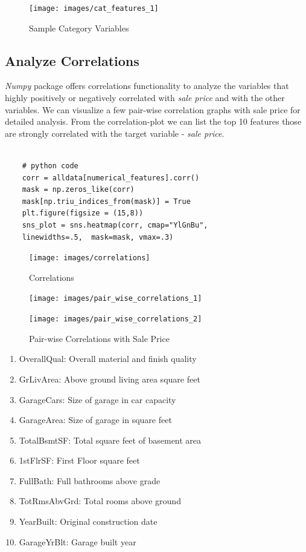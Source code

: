 \documentclass[sigconf]{acmart}
\begin{document}
	\begin{figure}[H]
		\centering
		\texttt{[image: images/cat\_features\_1]}	
		\caption{Sample Category Variables} \label{fig:cat_features_1} 
	\end{figure}
	
	\subsection{Analyze Correlations}		
	{\em Numpy} package offers correlations functionality to analyze the variables that highly positively or negatively correlated with {\em sale price} and with the other variables. We can  visualize a few pair-wise correlation graphs with sale price for detailed analysis. From the correlation-plot we can list the top 10 features those are strongly correlated with the target variable - {\em sale price}.
	
	\begin{verbatim}
	
	# python code 
	corr = alldata[numerical_features].corr()	
	mask = np.zeros_like(corr)
	mask[np.triu_indices_from(mask)] = True	
	plt.figure(figsize = (15,8))	
	sns_plot = sns.heatmap(corr, cmap="YlGnBu", 
	linewidths=.5,  mask=mask, vmax=.3)	
	\end{verbatim}
	
	\begin{figure}[H]
		\centering
		\texttt{[image: images/correlations]}	
		\caption{Correlations} \label{fig:correlations} 
	\end{figure}
	
	\begin{figure}[H]
		\centering
		\texttt{[image: images/pair\_wise\_correlations\_1]}	
	\end{figure}
	
	\begin{figure}[H]
		\centering
		\texttt{[image: images/pair\_wise\_correlations\_2]}	
		\caption{Pair-wise Correlations with Sale Price} \label{fig:pair_wise_correlations_2} 
	\end{figure}
	
	\begin{enumerate}
		\item OverallQual: Overall material and finish quality
		\item GrLivArea: Above ground living area square feet
		\item GarageCars: Size of garage in car capacity
		\item GarageArea: Size of garage in square feet
		\item TotalBsmtSF: Total square feet of basement area
		\item 1stFlrSF: First Floor square feet
		\item FullBath: Full bathrooms above grade
		\item TotRmsAbvGrd: Total rooms above ground
		\item YearBuilt: Original construction date
		\item GarageYrBlt: Garage built year		
	\end{enumerate}
	
\end{document}
